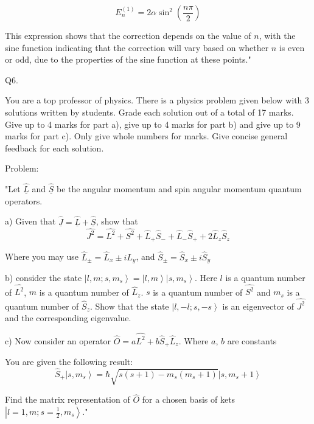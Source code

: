\[ E_{n}^{(1)} = 2\alpha \sin^{2}\left(\frac{n\pi}{2}\right) \]

This expression shows that the correction depends on the value of \( n \), with the sine function indicating that the correction will vary based on whether \( n \) is even or odd, due to the properties of the sine function at these points."



                           Q6. 

You are a top professor of physics. There is a physics problem given below with 3 solutions written by students. Grade each solution out of a total of 17 marks. Give up to 4 marks for part a), give up to 4 marks for part b) and give up to 9 marks for part c). Only give whole numbers for marks. Give concise general feedback for each solution. 

Problem:

"Let \( \hat{\underline{L}} \) and \( \hat{\underline{S}} \) be the angular momentum and spin angular momentum quantum operators. 

a) Given that \( \hat{\underline{J}} = \hat{\underline{L}} + \hat{\underline{S}} \), show that 
\[ \hat{J^{2}} =  \hat{L^{2}} + \hat{S^{2}} + \hat{L}_{+}\hat{S}_{-} +  \hat{L}_{-}\hat{S}_{+} + 2\hat{L}_{z}\hat{S}_{z} \]

Where you may use  \( \hat{L}_{\pm} = \hat{L}_{x} \pm i\hat{L}_{y} \), and \( \hat{S}_{\pm} = \hat{S}_{x} \pm i\hat{S}_{y} \)

b) consider the state \( \left|l, m; s, m_{s} \right> = \left|l, m \right>\left|s, m_{s} \right> \). Here \( l \) is a quantum number of \( \hat{L^{2}} \), \( m \) is a quantum number of \( \hat{L}_{z} \). \( s \) is a quantum number of \( \hat{S^{2}} \) and \( m_{s} \) is a quantum number of \( \hat{S}_{z} \). Show that the state \( \left|l, -l; s, -s \right> \) is an eigenvector of \( \hat{J^{2}} \) and the corresponding eigenvalue. 

c) Now consider an operator \( \hat{O} = a\hat{L^{2}} + b\hat{S}_{+}\hat{L}_{z} \). Where \( a \), \( b \) are constants

You are given the following result:
\[ \hat{S}_{+} \left|s, m_{s} \right> = \hbar \sqrt{s(s+1) - m_{s}(m_{s}+1)} \left|s, m_{s}+1 \right> \]

Find the matrix representation of \( \hat{O} \) for a chosen basis of kets \( \left|l=1, m; s=\frac{1}{2}, m_{s} \right> \)."

